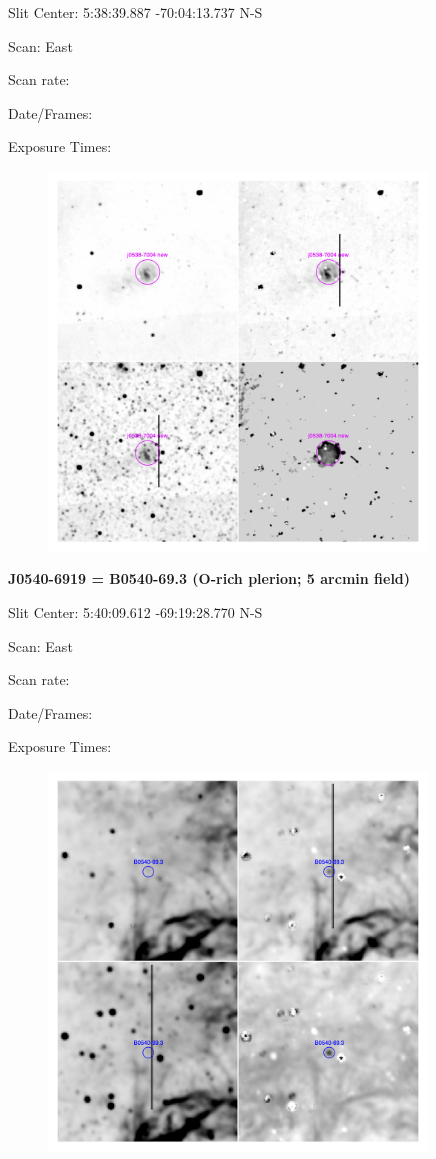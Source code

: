 \documentclass[11pt]{article}
\begin{document}
Slit Center:  5:38:39.887  -70:04:13.737 N-S

Scan:  East

Scan rate:  

Date/Frames:

Exposure Times:  

\begin{figure}
\includegraphics[width=10.05cm]{snapshots/J0538-7004.png}
\end{figure}

\newpage
{\bf J0540-6919 = B0540-69.3  (O-rich plerion; 5 arcmin field)}  
 
Slit Center:  5:40:09.612  -69:19:28.770 N-S

Scan:  East

Scan rate:  

Date/Frames:

Exposure Times:  

\begin{figure}
\includegraphics[width=10.05cm]{snapshots/B0540-693_5arcmin.png}
\end{figure}
\end{document}
